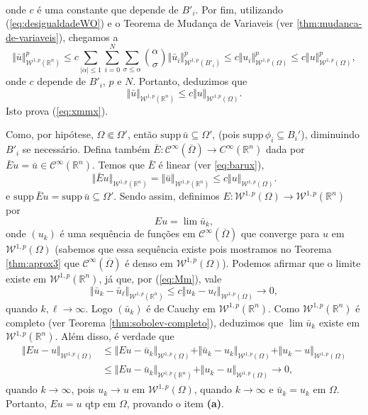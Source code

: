 \documentclass[a4paper, 11pt]{book}
\theoremstyle{definition}
\newcommand{\bR}{\mathbb{R}}
\newcommand{\cC}{\mathcal{C}}
\newcommand{\cW}{\mathcal{W}}
\newcommand{\supp}{\mathrm{supp}\,}
\begin{document}
\begin{prf}
\[\begin{aligned}
        \end{aligned}
    \]
    onde $c$ é uma constante que depende de $B'_i$.
    Por fim, utilizando (\ref{eq:desigualdadeWO}) e o Teorema de Mudança de Variaveis (ver \ref{thm:mudanca-de-variaveis}), chegamos a
    \[
         \Vert \bar u \Vert^p_{\cW^{1,p}(\bR^n)} \leqslant c\sum_{|\alpha| \leqslant 1} \sum_{i=0}^{N} \sum_{\sigma \leqslant \alpha} \binom{\alpha}{\sigma} \Vert \bar u_i \Vert_{\cW^{1,p}(B'_i)}^p \leqslant c\Vert u_i \Vert_{\cW^{1,p}(\Omega)}^p \leqslant c \Vert u \Vert_{\cW^{1,p}(\Omega)}^p,
    \]
    onde $c$ depende de $B'_i$, $p$ e $N$.
    Portanto, deduzimos que
    \begin{equation} \label{eq:Mm}
        \Vert \bar u \Vert_{\cW^{1,p}(\bR^n)} \leqslant c \Vert u \Vert_{\cW^{1,p}(\Omega)}.
    \end{equation}
    Isto prova (\ref{eq:xmmx}).

    Como, por hipótese, $\Omega \Subset \Omega'$, então $\supp \bar u \subseteq \Omega'$, (pois $\supp \phi_i \subseteq B_i'$), diminuindo $B'_i$ se necessário.
    Defina também $\bar E: \cC^\infty(\overline\Omega) \to C^\infty(\bR^n)$ dada por $\bar E u = \bar u \in \cC^{\infty}(\bR^n)$.
    Temos que $\bar E$ é linear (ver \ref{eq:barux}),
    \[
        \Vert \bar E u \Vert_{\cW^{1,p}(\bR^n)} = \Vert \bar u \Vert_{\cW^{1,p}(\bR^n)} \leqslant c \Vert u \Vert_{\cW^{1,p}(\Omega)}.
    \]
    e $\supp \bar E u  = \supp \bar u \subseteq \Omega'.$
    Sendo assim, definimos $E : \cW^{1,p}(\Omega) \to \cW^{1,p}(\bR^n)$ por
    \[
        Eu = \lim \bar u_k,
    \]
    onde $(u_k)$ é uma sequência de funções em $\cC^\infty(\overline\Omega)$ que converge para $u$ em $\cW^{1,p}(\Omega)$ (sabemos que essa sequência existe pois mostramos no Teorema \ref{thm:aprox3} que $\cC^\infty(\overline\Omega)$ é denso em $\cW^{1,p}(\Omega)$).
    Podemos afirmar que o limite existe em $\cW^{1,p}(\bR^n)$, já que, por (\ref{eq:Mm}), vale
    \[
        \Vert \bar u_k - \bar u_\ell \Vert_{\cW^{1,p}(\bR^n)} \leqslant c \Vert u_k - u_\ell \Vert_{\cW^{1,p}(\Omega)} \to 0,
    \]
    quando $k,\ell \to \infty$.
    Logo $(\bar u_k)$ é de Cauchy em $\cW^{1,p}(\bR^n)$.
    Como $\cW^{1,p}(\bR^n)$ é completo (ver Teorema \ref{thm:sobolev-completo}), deduzimos que $\lim \bar u_k$ existe em $\cW^{1,p}(\bR^n)$.
    Além disso, é verdade que
    \[
        \begin{aligned}
            \Vert Eu - u \Vert_{\cW^{1,p}(\Omega)} &\leqslant \Vert Eu - \bar u_k \Vert_{\cW^{1,p}(\Omega)} + \Vert \bar u_k - u_k \Vert_{\cW^{1,p}(\Omega)} + \Vert u_k - u\Vert_{\cW^{1,p}(\Omega)}\\
            &\leqslant \Vert Eu - \bar u_k \Vert_{\cW^{1,p}(\bR^n)} + \Vert u_k - u \Vert_{\cW^{1,p}(\Omega)} \to 0,
        \end{aligned}
    \]
    quando $k \to \infty$,
    pois $u_k \to u$ em $\cW^{1,p}(\Omega)$, quando $k \to \infty$ e $\bar u_k = u_k$ em $\Omega$.
    Portanto, $Eu = u$ qtp em $\Omega$, provando o item \textbf{(a)}.


\end{prf}
\end{document}
